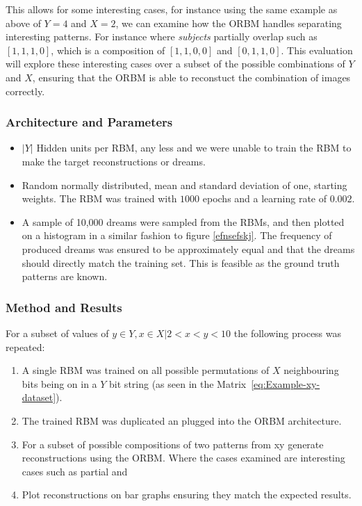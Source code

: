 This allows for some interesting cases, for instance using the same example as above of $Y = 4 $ and $ X = 2 $, we can examine how the ORBM handles separating interesting patterns. For instance where \emph{subjects} partially overlap such as $[1,1,1,0]$, which is a composition of $[1,1,0,0]$ and $[0,1,1,0]$. This evaluation will explore these interesting cases over a subset of the possible combinations of $Y$ and $X$, ensuring that the ORBM is able to reconstuct the combination of images correctly.


\subsubsection{Architecture and Parameters}
\begin{itemize}
  \item $|Y|$ Hidden units per RBM, any less and we were unable to train the RBM to make the target reconstructions or dreams.
  \item Random normally distributed, mean and standard deviation of one, starting weights. The RBM was trained with $1000$ epochs and a learning rate of $0.002$.
  \item A sample of 10,000 dreams were sampled from the RBMs, and then plotted on a histogram in a similar fashion to figure \ref{efnsefskj}. The frequency of produced dreams was ensured to be approximately equal and that the dreams should directly match the training set. This is feasible as the ground truth patterns are known.
\end{itemize}


\subsubsection{Method and Results}

For a subset of values of $y \in Y, x \in X | 2 < x < y < 10$ the following process was repeated:

\begin{enumerate}
  \item A single RBM was trained on all possible permutations of $X$ neighbouring bits being on in a $Y$ bit string (as seen in the Matrix~\ref{eq:Example-xy-dataset}).
  \item The trained RBM was duplicated an plugged into the ORBM architecture.
  \item For a subset of possible compositions of two patterns from xy  generate reconstructions using the ORBM. Where the cases examined are interesting cases such as partial and 
  \item Plot reconstructions on bar graphs ensuring they match the expected results.
\end{enumerate}

